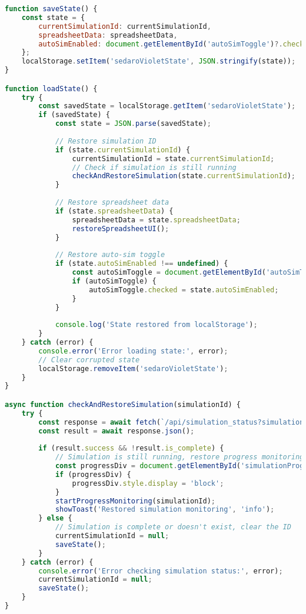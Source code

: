 \documentclass[12pt,a4paper]{article}
\begin{document}
\begin{lstlisting}[language=JavaScript, caption=State Persistence Implementation]
function saveState() {
    const state = {
        currentSimulationId: currentSimulationId,
        spreadsheetData: spreadsheetData,
        autoSimEnabled: document.getElementById('autoSimToggle')?.checked || false
    };
    localStorage.setItem('sedaroVioletState', JSON.stringify(state));
}

function loadState() {
    try {
        const savedState = localStorage.getItem('sedaroVioletState');
        if (savedState) {
            const state = JSON.parse(savedState);
            
            // Restore simulation ID
            if (state.currentSimulationId) {
                currentSimulationId = state.currentSimulationId;
                // Check if simulation is still running
                checkAndRestoreSimulation(state.currentSimulationId);
            }
            
            // Restore spreadsheet data
            if (state.spreadsheetData) {
                spreadsheetData = state.spreadsheetData;
                restoreSpreadsheetUI();
            }
            
            // Restore auto-sim toggle
            if (state.autoSimEnabled !== undefined) {
                const autoSimToggle = document.getElementById('autoSimToggle');
                if (autoSimToggle) {
                    autoSimToggle.checked = state.autoSimEnabled;
                }
            }
            
            console.log('State restored from localStorage');
        }
    } catch (error) {
        console.error('Error loading state:', error);
        // Clear corrupted state
        localStorage.removeItem('sedaroVioletState');
    }
}

async function checkAndRestoreSimulation(simulationId) {
    try {
        const response = await fetch(`/api/simulation_status?simulation_id=${simulationId}`);
        const result = await response.json();
        
        if (result.success && !result.is_complete) {
            // Simulation is still running, restore progress monitoring
            const progressDiv = document.getElementById('simulationProgress');
            if (progressDiv) {
                progressDiv.style.display = 'block';
            }
            startProgressMonitoring(simulationId);
            showToast('Restored simulation monitoring', 'info');
        } else {
            // Simulation is complete or doesn't exist, clear the ID
            currentSimulationId = null;
            saveState();
        }
    } catch (error) {
        console.error('Error checking simulation status:', error);
        currentSimulationId = null;
        saveState();
    }
}


\end{lstlisting}
\end{document}
